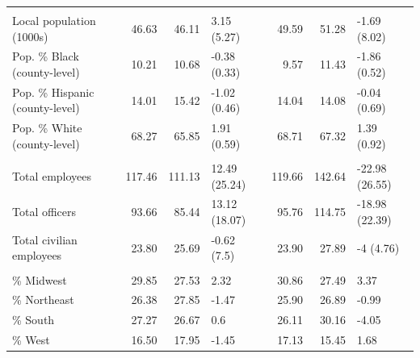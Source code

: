 \begin{table}
\begin{tabular}[t]{lrrlrrl}
\addlinespace[0.3em]
\multicolumn{7}{l}{\textbf{Population}}\\
\hspace{1em}Local population (1000s) & 46.63 & 46.11 & 3.15 (5.27) & 49.59 & 51.28 & -1.69 (8.02)\\
\hspace{1em}Pop. \% Black (county-level) & 10.21 & 10.68 & -0.38 (0.33) & 9.57 & 11.43 & -1.86 (0.52)\\
\hspace{1em}Pop. \% Hispanic (county-level) & 14.01 & 15.42 & -1.02 (0.46) & 14.04 & 14.08 & -0.04 (0.69)\\
\hspace{1em}Pop. \% White (county-level) & 68.27 & 65.85 & 1.91 (0.59) & 68.71 & 67.32 & 1.39 (0.92)\\
\addlinespace[0.3em]
\multicolumn{7}{l}{\textbf{Department size (\# of employees)}}\\
\hspace{1em}Total employees & 117.46 & 111.13 & 12.49 (25.24) & 119.66 & 142.64 & -22.98 (26.55)\\
\hspace{1em}Total officers & 93.66 & 85.44 & 13.12 (18.07) & 95.76 & 114.75 & -18.98 (22.39)\\
\hspace{1em}Total civilian employees & 23.80 & 25.69 & -0.62 (7.5) & 23.90 & 27.89 & -4 (4.76)\\
\addlinespace[0.3em]
\multicolumn{7}{l}{\textbf{Census region}}\\
\hspace{1em}\% Midwest & 29.85 & 27.53 & 2.32 & 30.86 & 27.49 & 3.37\\
\hspace{1em}\% Northeast & 26.38 & 27.85 & -1.47 & 25.90 & 26.89 & -0.99\\
\hspace{1em}\% South & 27.27 & 26.67 & 0.6 & 26.11 & 30.16 & -4.05\\
\hspace{1em}\% West & 16.50 & 17.95 & -1.45 & 17.13 & 15.45 & 1.68\\
\bottomrule
\end{tabular}
\end{table}
